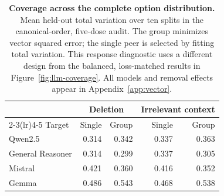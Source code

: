 \begin{table}[!ht]
\centering\small
\caption{\textbf{Coverage across the complete option distribution.} Mean held-out total variation over ten splits in the canonical-order, five-dose audit. The group minimizes vector squared error; the single peer is selected by fitting total variation. This response diagnostic uses a different design from the balanced, loss-matched results in Figure~\ref{fig:llm-coverage}. All models and removal effects appear in Appendix~\ref{app:vector}.}
\label{tab:vector-main}
\begin{tabular}{lrrrr}
\toprule
& \multicolumn{2}{c}{Deletion} & \multicolumn{2}{c}{Irrelevant context}\\
\cmidrule(lr){2-3}\cmidrule(lr){4-5}
Target & Single & Group & Single & Group\\
\midrule
Qwen2.5 & 0.314 & 0.342 & 0.337 & 0.363\\
General Reasoner & 0.314 & 0.299 & 0.337 & 0.305\\
Mistral & 0.421 & 0.360 & 0.416 & 0.352\\
Gemma & 0.486 & 0.543 & 0.468 & 0.538\\
\bottomrule
\end{tabular}
\end{table}
